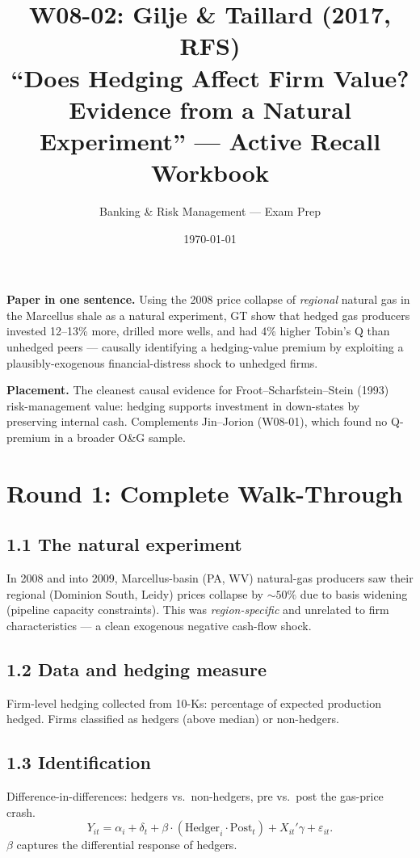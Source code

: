 \documentclass[11pt]{article}
\title{W08-02: Gilje \& Taillard (2017, RFS) \\
\large ``Does Hedging Affect Firm Value? Evidence from a Natural Experiment'' --- Active Recall Workbook}
\author{Banking \& Risk Management --- Exam Prep}
\date{\today}
\begin{document}
\maketitle

\begin{keybox}
\textbf{Paper in one sentence.} Using the 2008 price collapse of \emph{regional} natural gas in the Marcellus shale as a natural experiment, GT show that hedged gas producers invested 12--13\% more, drilled more wells, and had 4\% higher Tobin's Q than unhedged peers --- causally identifying a hedging-value premium by exploiting a plausibly-exogenous financial-distress shock to unhedged firms.

\textbf{Placement.} The cleanest causal evidence for Froot--Scharfstein--Stein (1993) risk-management value: hedging supports investment in down-states by preserving internal cash. Complements Jin--Jorion (W08-01), which found no Q-premium in a broader O\&G sample.
\end{keybox}

\section*{Round 1: Complete Walk-Through}

\subsection*{1.1 The natural experiment}
In 2008 and into 2009, Marcellus-basin (PA, WV) natural-gas producers saw their regional (Dominion South, Leidy) prices collapse by $\sim 50\%$ due to basis widening (pipeline capacity constraints). This was \emph{region-specific} and unrelated to firm characteristics --- a clean exogenous negative cash-flow shock.

\subsection*{1.2 Data and hedging measure}
Firm-level hedging collected from 10-Ks: percentage of expected production hedged. Firms classified as hedgers (above median) or non-hedgers.

\subsection*{1.3 Identification}
Difference-in-differences: hedgers vs.\ non-hedgers, pre vs.\ post the gas-price crash.
\[
Y_{it}=\alpha_i+\delta_t+\beta\cdot (\text{Hedger}_i\cdot\text{Post}_t)+X_{it}'\gamma+\varepsilon_{it}.
\]
$\beta$ captures the differential response of hedgers.
\end{document}
